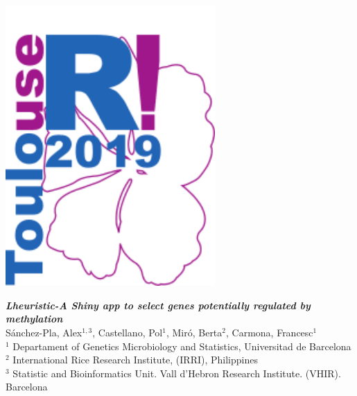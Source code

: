 
\colorbox{qmuldarkblue}{
 \color{white}
 
\begin{minipage}{0.2\textwidth}
\begin{center}
 \vskip 1cm
	
  \includegraphics[width=8cm]{images/useRToulouse.png}

     \end{center}
     
\end{minipage}


\begin{minipage}{0.6\textwidth}
\vspace*{0.4cm}
\begin{center}
   \textrm
   {
    {\huge \bf \em Lheuristic-A Shiny app to select genes potentially regulated by methylation}\\[1ex]
    {\large Sánchez-Pla, Alex$^{1,3}$, Castellano, Pol$^1$,  Mir\'{o}, Berta$^2$, Carmona, Francesc$^1$}\\[1ex]
    {\large $^1$ Departament of Genetics Microbiology and Statistics, Universitad de Barcelona\\
    $^2$ International Rice Research Institute, (IRRI), Philippines\\
    $^3$ Statistic and Bioinformatics Unit. Vall d'Hebron Research Institute.  (VHIR). Barcelona}
   }
   \end{center}
   

\end{minipage}}
